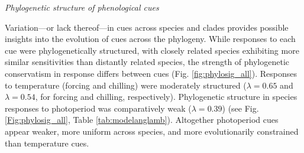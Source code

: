 \documentclass[11pt]{article}
\begin{document}
\emph{Phylogenetic structure of phenological cues}

Variation---or lack thereof---in cues across species and clades provides possible insights into the evolution of cues across the phylogeny. While responses to each cue were phylogenetically structured, with closely related species exhibiting more similar sensitivities than distantly related species, the strength of phylogenetic conservatism in response differs between cues (Fig. \ref{fig:phylosig_all}). Responses to temperature (forcing and chilling) were moderately structured ($\lambda = 0.65$ and $\lambda = 0.54$, for forcing and chilling, respectively). Phylogenetic structure in species responses to photoperiod was comparatively weak ($\lambda= 0.39$) (see Fig. \ref{Fig:phylosig_all}, Table \ref{tab:modelanglamb}). Altogether photoperiod cues appear weaker, more uniform across species, and more evolutionarily constrained than temperature cues. %
\end{document}
